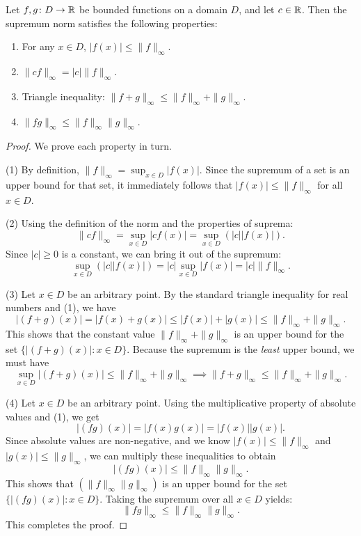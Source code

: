 \documentclass[../analysis1.tex]{subfiles}
\begin{document}
\begin{lemma}
\label{lem:supnormproperties}
    \begin{shaded*}
        Let $f, g \colon D \to \mathbb{R}$ be bounded functions on a domain $D$, and let $c \in \mathbb{R}$. Then the supremum norm satisfies the following properties:
        \begin{enumerate}
            \item For any $x \in D$, $|f(x)| \le \|f\|_\infty$.
            \item $\|cf\|_\infty = |c| \|f\|_\infty$.
            \item Triangle inequality: $\|f + g\|_\infty \le \|f\|_\infty + \|g\|_\infty$.
            \item $\|fg\|_\infty \le \|f\|_\infty \|g\|_\infty$.
        \end{enumerate}
    \end{shaded*}
\end{lemma}
\begin{proof}
    We prove each property in turn.
    
    (1) By definition, $\|f\|_\infty = \sup_{x \in D} |f(x)|$. Since the supremum of a set is an upper bound for that set, it immediately follows that $|f(x)| \le \|f\|_\infty$ for all $x \in D$.
    
    (2) Using the definition of the norm and the properties of suprema:
    \[
        \|cf\|_\infty = \sup_{x \in D} |cf(x)| = \sup_{x \in D} \left( |c| |f(x)| \right).
    \]
    Since $|c| \ge 0$ is a constant, we can bring it out of the supremum:
    \[
        \sup_{x \in D} \left( |c| |f(x)| \right) = |c| \sup_{x \in D} |f(x)| = |c| \|f\|_\infty.
    \]
    
    (3) Let $x \in D$ be an arbitrary point. By the standard triangle inequality for real numbers and (1), we have
    \[
        |(f + g)(x)| = |f(x) + g(x)| \le |f(x)| + |g(x)| \le \|f\|_\infty + \|g\|_\infty.
    \]
    This shows that the constant value $\|f\|_\infty + \|g\|_\infty$ is an upper bound for the set $\{|(f+g)(x)| : x \in D\}$. Because the supremum is the \textit{least} upper bound, we must have
    \[
        \sup_{x \in D} |(f+g)(x)| \le \|f\|_\infty + \|g\|_\infty \implies \|f + g\|_\infty \le \|f\|_\infty + \|g\|_\infty.
    \]
    
    (4) Let $x \in D$ be an arbitrary point. Using the multiplicative property of absolute values and (1), we get
    \[
        |(fg)(x)| = |f(x)g(x)| = |f(x)| |g(x)|.
    \]
    Since absolute values are non-negative, and we know $|f(x)| \le \|f\|_\infty$ and $|g(x)| \le \|g\|_\infty$, we can multiply these inequalities to obtain
    \[
        |(fg)(x)| \le \|f\|_\infty \|g\|_\infty.
    \]
    This shows that $(\|f\|_\infty \|g\|_\infty)$ is an upper bound for the set $\{|(fg)(x)| : x \in D\}$. Taking the supremum over all $x \in D$ yields:
    \[
        \|fg\|_\infty \le \|f\|_\infty \|g\|_\infty.
    \]
    This completes the proof.\qedhere
\end{proof}
\end{document}
